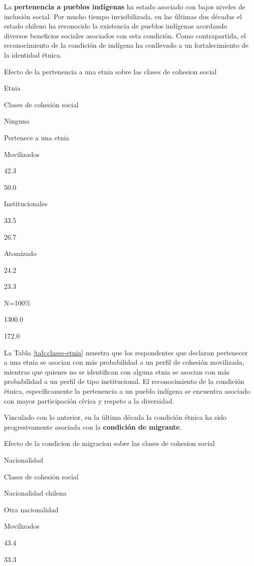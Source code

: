 \documentclass[
  12pt,
]{book}
\begin{document}
La \textbf{pertenencia a pueblos indígenas} ha estado asociado con bajos niveles de inclusión social. Por mucho tiempo invisibilizada, en las últimas dos décadas el estado chileno ha reconocido la existencia de pueblos indígenas acordando diversos beneficios sociales asociados con esta condición. Como contrapartida, el reconocimiento de la condición de indígena ha conllevado a un fortalecimiento de la identidad étnica.

\label{tab:clases-etnia}Efecto de la pertenencia a una etnia sobre las clases de cohesion social

Etnia

Clases de cohesión social

Ninguna

Pertenece a una etnia

Movilizados

42.3

50.0

Institucionales

33.5

26.7

Atomizado

24.2

23.3

N=100\%

1300.0

172.0

La Tabla \ref{tab:clases-etnia} muestra que los respondentes que declaran pertenecer a una etnia se asocian con más probabilidad a un perfil de cohesión movilizada, mientras que quienes no se identifican con alguna etnia se asocian con más probabilidad a un perfil de tipo institucional. El reconocimiento de la condición étnica, específicamente la pertenencia a un pueblo indígena se encuentra asociado con mayor participación cívica y respeto a la diversidad.

Vinculado con lo anterior, en la última década la condición étnica ha sido progresivamente asociada con la \textbf{condición de migrante}.

\label{tab:clases-nacion}Efecto de la condicion de migracion sobre las clases de cohesion social

Nacionalidad

Clases de cohesión social

Nacionalidad chilena

Otra nacionalidad

Movilizados

43.4

33.3
\end{document}

